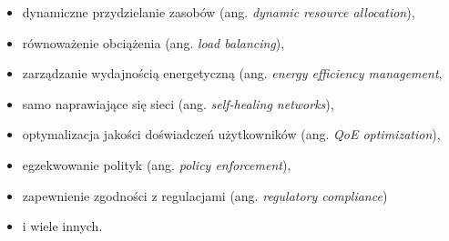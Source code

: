 \begin{itemize}
    \item dynamiczne przydzielanie zasobów (ang. \textit{dynamic resource allocation}), 
    \item równoważenie obciążenia (ang. \textit{load balancing}), 
    \item zarządzanie wydajnością energetyczną (ang. \textit{energy efficiency management}, 
    \item samo naprawiające się sieci (ang. \textit{self-healing networks}), 
    \item optymalizacja jakości doświadczeń użytkowników (ang. \textit{QoE optimization}), 
    \item egzekwowanie polityk (ang. \textit{policy enforcement}), 
    \item zapewnienie zgodności z regulacjami (ang. \textit{regulatory compliance}) 
    \item i wiele innych.
\end{itemize}
